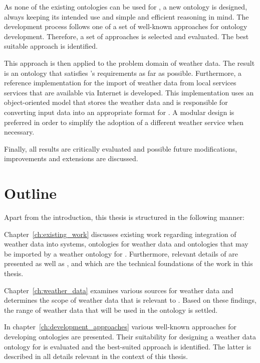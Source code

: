 As none of the existing ontologies can be used for \thinkhome, a new  ontology is designed, always keeping its intended use and simple and efficient reasoning in mind. The development process follows one of a set of well-known approaches for ontology development. Therefore, a set of approaches is selected and evaluated. The best suitable approach is identified.

This approach is then applied to the problem domain of weather data. The result is an ontology that satisfies \thinkhome's requirements as far as possible. Furthermore, a reference implementation for the import of weather data from local services services that are available via Internet is developed. This implementation uses an object-oriented model that stores the weather data and is responsible for converting input data into an appropriate format for \thinkhome. A modular design is preferred in order to simplify the adoption of a different weather service when necessary.

Finally, all results are critically evaluated and possible future modifications, improvements and extensions are discussed.

\section{Outline}

Apart from the introduction, this thesis is structured in the following manner:

Chapter~\ref{ch:existing_work} discusses existing work regarding integration of weather data into \smarthome systems, ontologies for weather data and ontologies that may be imported by a weather ontology for \thinkhome. Furthermore, relevant details of \thinkhome are presented as well as ,  and  which are the technical foundations of the work in this thesis.

Chapter~\ref{ch:weather_data} examines various sources for weather data and determines the scope of weather data that is relevant to \thinkhome. Based on these findings, the range of weather data that will be used in the ontology is settled.

In chapter~\ref{ch:development_approaches} various well-known approaches for developing ontologies are presented. Their suitability for designing a weather data ontology for \thinkhome is evaluated and the best-suited approach is identified. The latter is described in all details relevant in the context of this thesis.

